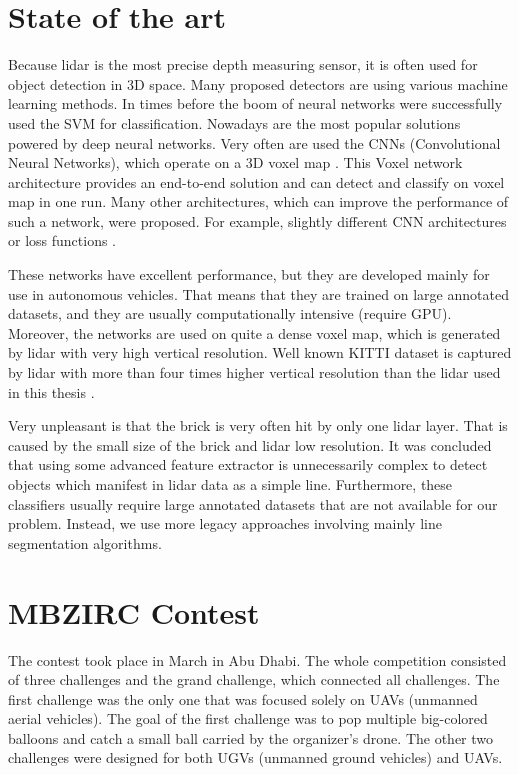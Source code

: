 \section{State of the art}
Because lidar is the most precise depth measuring sensor, it is often used for object detection in 3D space. Many proposed detectors are using various machine learning methods. In times before the boom of neural networks were successfully used the SVM for classification\cite{himmelsbach2008}. Nowadays are the most popular solutions powered by deep neural networks. Very often are used the CNNs (Convolutional Neural Networks), which operate on a 3D voxel map \cite{zhou2017}. This Voxel network architecture provides an end-to-end solution and can detect and classify on voxel map in one run. Many other architectures, which can improve the performance of such a network, were proposed. For example, slightly different CNN architectures or loss functions \cite{yan2018}. 

These networks have excellent performance, but they are developed mainly for use in autonomous vehicles. That means that they are trained on large annotated datasets, and they are usually computationally intensive (require GPU). Moreover, the networks are used on quite a dense voxel map, which is generated by lidar with very high vertical resolution. Well known KITTI dataset is captured by lidar with more than four times higher vertical resolution than the lidar used in this thesis \cite{geiger2013}.

Very unpleasant is that the brick is very often hit by only one lidar layer. That is caused by the small size of the brick and lidar low resolution. It was concluded that using some advanced feature extractor is unnecessarily complex to detect objects which manifest in lidar data as a simple line. Furthermore, these classifiers usually require large annotated datasets that are not available for our problem. Instead, we use more legacy approaches involving mainly line segmentation algorithms.

\section{MBZIRC Contest}
The contest took place in March in Abu Dhabi. The whole competition consisted of three challenges and the grand challenge, which connected all challenges. The first challenge was the only one that was focused solely on UAVs (unmanned aerial vehicles). The goal of the first challenge was to pop multiple big-colored balloons and catch a small ball carried by the organizer's drone. The other two challenges were designed for both UGVs (unmanned ground vehicles) and UAVs. 

